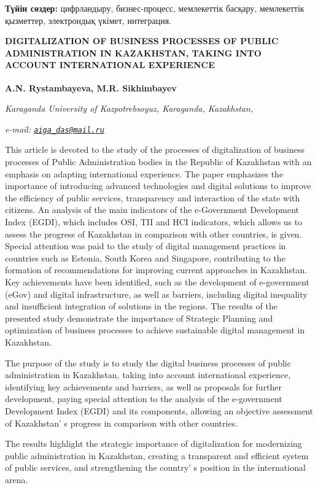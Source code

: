 {{\bfseries Түйін сөздер:} цифрландыру, бизнес-процесс, мемлекеттік басқару,
мемлекеттік қызметтер, электрондық үкімет, интеграция.

{\bfseries DIGITALIZATION OF BUSINESS PROCESSES OF PUBLIC ADMINISTRATION IN
KAZAKHSTAN, TAKING INTO ACCOUNT INTERNATIONAL EXPERIENCE}

{\bfseries A.N. Rystambayeva\textsuperscript{\envelope }, M.R. Sikhimbayev}

\emph{Karaganda University of Kazpotrebsoyuz, Karaganda, Kazakhstan,}

\emph{e-mail:
\href{mailto:aiga_das@mail.ru}{\nolinkurl{aiga\_das@mail.ru}}}

This article is devoted to the study of the processes of digitalization
of business processes of Public Administration bodies in the Republic of
Kazakhstan with an emphasis on adapting international experience. The
paper emphasizes the importance of introducing advanced technologies and
digital solutions to improve the efficiency of public services,
transparency and interaction of the state with citizens. An analysis of
the main indicators of the e-Government Development Index (EGDI), which
includes OSI, TII and HCI indicators, which allows us to assess the
progress of Kazakhstan in comparison with other countries, is given.
Special attention was paid to the study of digital management practices
in countries such as Estonia, South Korea and Singapore, contributing to
the formation of recommendations for improving current approaches in
Kazakhstan. Key achievements have been identified, such as the
development of e-government (eGov) and digital infrastructure, as well
as barriers, including digital inequality and insufficient integration
of solutions in the regions. The results of the presented study
demonstrate the importance of Strategic Planning and optimization of
business processes to achieve sustainable digital management in
Kazakhstan.

The purpose of the study is to study the digital business processes of
public administration in Kazakhstan, taking into account international
experience, identifying key achievements and barriers, as well as
proposals for further development, paying special attention to the
analysis of the e-government Development Index (EGDI) and its
components, allowing an objective assessment of
Kazakhstan' s progress in comparison with other
countries.

The results highlight the strategic importance of digitalization for
modernizing public administration in Kazakhstan, creating a transparent
and efficient system of public services, and strengthening the
country' s position in the international arena.

}
